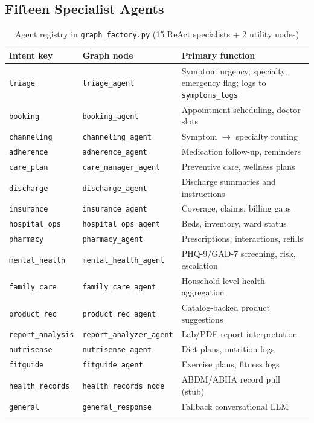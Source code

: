 \documentclass[12pt,a4paper]{article}
\begin{document}
\subsection{Fifteen Specialist Agents}

\begin{longtable}{@{}p{3.2cm}p{4.2cm}p{7.5cm}@{}}
\toprule
\textbf{Intent key} & \textbf{Graph node} & \textbf{Primary function} \\
\midrule
\endhead
\texttt{triage} & \texttt{triage\_agent} & Symptom urgency, specialty, emergency flag; logs to \texttt{symptoms\_logs} \\
\texttt{booking} & \texttt{booking\_agent} & Appointment scheduling, doctor slots \\
\texttt{channeling} & \texttt{channeling\_agent} & Symptom $\rightarrow$ specialty routing \\
\texttt{adherence} & \texttt{adherence\_agent} & Medication follow-up, reminders \\
\texttt{care\_plan} & \texttt{care\_manager\_agent} & Preventive care, wellness plans \\
\texttt{discharge} & \texttt{discharge\_agent} & Discharge summaries and instructions \\
\texttt{insurance} & \texttt{insurance\_agent} & Coverage, claims, billing gaps \\
\texttt{hospital\_ops} & \texttt{hospital\_ops\_agent} & Beds, inventory, ward status \\
\texttt{pharmacy} & \texttt{pharmacy\_agent} & Prescriptions, interactions, refills \\
\texttt{mental\_health} & \texttt{mental\_health\_agent} & PHQ-9/GAD-7 screening, risk, escalation \\
\texttt{family\_care} & \texttt{family\_care\_agent} & Household-level health aggregation \\
\texttt{product\_rec} & \texttt{product\_rec\_agent} & Catalog-backed product suggestions \\
\texttt{report\_analysis} & \texttt{report\_analyzer\_agent} & Lab/PDF report interpretation \\
\texttt{nutrisense} & \texttt{nutrisense\_agent} & Diet plans, nutrition logs \\
\texttt{fitguide} & \texttt{fitguide\_agent} & Exercise plans, fitness logs \\
\midrule
\texttt{health\_records} & \texttt{health\_records\_node} & ABDM/ABHA record pull (stub) \\
\texttt{general} & \texttt{general\_response} & Fallback conversational LLM \\
\bottomrule
\caption{Agent registry in \texttt{graph\_factory.py} (15 ReAct specialists + 2 utility nodes)}
\end{longtable}
\end{document}
